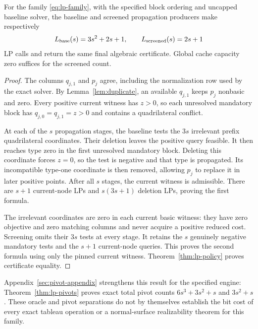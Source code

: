 \begin{theorem}\label{thm:lp-family}
For the family \eqref{eq:lp-family}, with the specified block ordering and
uncapped baseline solver, the baseline and screened propagation producers
make respectively
\begin{equation}\label{eq:lp-counts}
 L_{\rm base}(s)=3s^2+2s+1,\qquad
 L_{\rm screened}(s)=2s+1
\end{equation}
LP calls and return the same final algebraic certificate. Global cache
capacity zero suffices for the screened count.
\end{theorem}
\begin{proof}
The columns $q_{j,1}$ and $p_j$ agree, including the normalization row
used by the exact solver. By Lemma~\ref{lem:duplicate}, an available
$q_{j,1}$ keeps $p_j$ nonbasic and zero. Every positive current witness has
$z>0$, so each unresolved mandatory block has
$q_{j,0}=q_{j,1}=z>0$ and contains a quadrilateral conflict.

At each of the $s$ propagation stages, the baseline tests the $3s$
irrelevant prefix quadrilateral coordinates. Their deletion leaves the
positive query feasible. It then reaches type zero in the first unresolved
mandatory block. Deleting this coordinate forces $z=0$, so the test is
negative and that type is propagated. Its incompatible type-one coordinate
is then removed, allowing $p_j$ to replace it in later positive points.
After all $s$ stages, the current witness is admissible. There are $s+1$
current-node LPs and $s(3s+1)$ deletion LPs, proving the first formula.

The irrelevant coordinates are zero in each current basic witness:
they have zero objective and zero matching columns and never acquire a
positive reduced cost. Screening omits their $3s$ tests at every stage.
It retains the $s$ genuinely negative mandatory tests and the $s+1$
current-node queries. This proves the second formula using only the
pinned current witness. Theorem~\ref{thm:lp-policy} proves certificate equality.
\end{proof}

Appendix~\ref{sec:pivot-appendix} strengthens this result for the specified
engine: Theorem~\ref{thm:lp-pivots} proves exact total pivot counts
$6s^3+3s^2+s$ and $3s^2+s$. These oracle and pivot separations do not by
themselves establish the bit cost of every exact tableau operation or a
normal-surface realizability theorem for this family.
